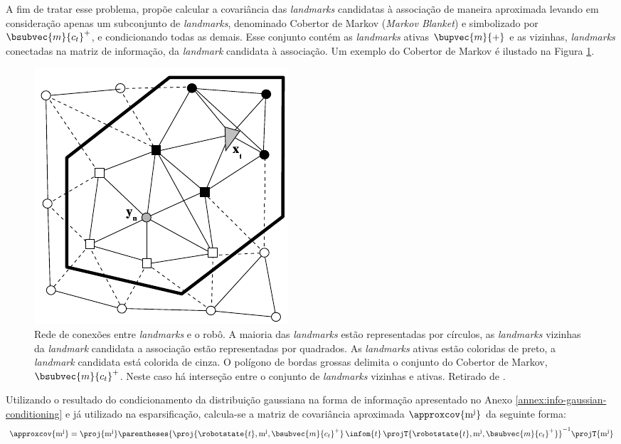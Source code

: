 A fim de tratar esse problema, \cite[p.~5]{liu2003results} propõe 
calcular a covariância das \textit{landmarks} candidatas à associação 
de maneira aproximada levando em consideração apenas um subconjunto 
de \textit{landmarks}, denominado Cobertor de Markov 
(\textit{Markov Blanket}) e simbolizado por $\bsubvec{m}{c_t}^+$, e condicionando todas as demais. Esse conjunto contém as \textit{landmarks} ativas 
$\bupvec{m}{+}$ e as vizinhas, \textit{landmarks} conectadas na matriz de 
informação, da \textit{landmark} candidata à associação. Um exemplo do Cobertor 
de Markov é ilustado na Figura \ref{fig:markov-blanket}.

\begin{figure}[h]
  \centering
  \includegraphics[]{figs/pb-markov-blanket}
  \caption[Visualização da rede formada entre o robô e os \textit{landmarks}]{Rede de conexões entre \textit{landmarks} e o robô. A maioria das \textit{landmarks} estão representadas por círculos, as \textit{landmarks} vizinhas da \textit{landmark} candidata a associação estão representadas por quadrados. As \textit{landmarks} ativas estão coloridas de preto, a \textit{landmark} candidata está colorida de cinza. O polígono de bordas grossas delimita o conjunto do Cobertor de Markov, $\bsubvec{m}{c_t}^+$. Neste caso há interseção entre o conjunto de \textit{landmarks} vizinhas e ativas. Retirado de \cite[p.~410]{thrun2005probabilistic}.}
  \label{fig:markov-blanket}
\end{figure}

Utilizando o resultado do condicionamento da distribuição gaussiana na forma de 
informação apresentado no Anexo \ref{annex:info-gaussian-conditioning} e já 
utilizado na esparsificação, calcula-se a matriz de covariância aproximada $\approxcov{\mathrm{m^j}}$ da seguinte forma:
\begin{equation}
  \approxcov{\mathrm{m^j}} = \proj{\mathrm{m^j}} \parentheses{\proj{\robotstate{t}, \mathrm{m^j}, \bsubvec{m}{c_t}^+}\, \infom{t} \,\projT{\robotstate{t}, \mathrm{m^j}, \bsubvec{m}{c_t}^+}}^{-1} \projT{\mathrm{m^j}}
\end{equation}

